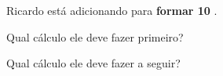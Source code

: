 \begin{question}
\begin{instance}
\begin{statement}
Ricardo está adicionando para \textbf{formar 10}
.\par
{}
\end{statement}
\begin{mcq}[standalone=false,no-label=true]
\begin{stem}
Qual cálculo ele deve fazer primeiro?\par

\end{stem}
\begin{distractors}

\end{distractors}

\end{mcq}
\begin{mcq}[standalone=false,no-label=true]
\begin{stem}
Qual cálculo ele deve fazer a seguir?\par

\end{stem}
\begin{distractors}

\end{distractors}

\end{mcq}

\end{instance}

\end{question}
